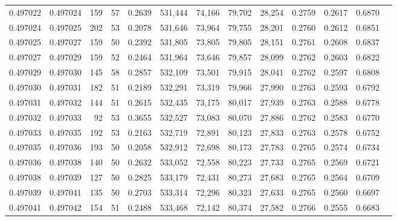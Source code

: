 \begin{tabular}{rrrrrrrrrrrrr}
0.497022 & 0.497024 &   159 &  57 &                                     0.2639 & 531,444 &  74,166 &  79,702 &  28,254 & 0.2759 & 0.2617 & 0.6870 \\
0.497024 & 0.497025 &   202 &  53 &                                     0.2078 & 531,646 &  73,964 &  79,755 &  28,201 & 0.2760 & 0.2612 & 0.6851 \\
0.497025 & 0.497027 &   159 &  50 &                                     0.2392 & 531,805 &  73,805 &  79,805 &  28,151 & 0.2761 & 0.2608 & 0.6837 \\
0.497027 & 0.497029 &   159 &  52 &                                     0.2464 & 531,964 &  73,646 &  79,857 &  28,099 & 0.2762 & 0.2603 & 0.6822 \\
0.497029 & 0.497030 &   145 &  58 &                                     0.2857 & 532,109 &  73,501 &  79,915 &  28,041 & 0.2762 & 0.2597 & 0.6808 \\
0.497030 & 0.497031 &   182 &  51 &                                     0.2189 & 532,291 &  73,319 &  79,966 &  27,990 & 0.2763 & 0.2593 & 0.6792 \\
0.497031 & 0.497032 &   144 &  51 &                                     0.2615 & 532,435 &  73,175 &  80,017 &  27,939 & 0.2763 & 0.2588 & 0.6778 \\
0.497032 & 0.497033 &    92 &  53 &                                     0.3655 & 532,527 &  73,083 &  80,070 &  27,886 & 0.2762 & 0.2583 & 0.6770 \\
0.497033 & 0.497035 &   192 &  53 &                                     0.2163 & 532,719 &  72,891 &  80,123 &  27,833 & 0.2763 & 0.2578 & 0.6752 \\
0.497035 & 0.497036 &   193 &  50 &                                     0.2058 & 532,912 &  72,698 &  80,173 &  27,783 & 0.2765 & 0.2574 & 0.6734 \\
0.497036 & 0.497038 &   140 &  50 &                                     0.2632 & 533,052 &  72,558 &  80,223 &  27,733 & 0.2765 & 0.2569 & 0.6721 \\
0.497038 & 0.497039 &   127 &  50 &                                     0.2825 & 533,179 &  72,431 &  80,273 &  27,683 & 0.2765 & 0.2564 & 0.6709 \\
0.497039 & 0.497041 &   135 &  50 &                                     0.2703 & 533,314 &  72,296 &  80,323 &  27,633 & 0.2765 & 0.2560 & 0.6697 \\
0.497041 & 0.497042 &   154 &  51 &                                     0.2488 & 533,468 &  72,142 &  80,374 &  27,582 & 0.2766 & 0.2555 & 0.6683 \\

\end{tabular}
